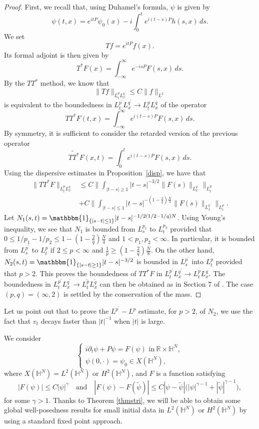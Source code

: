 \documentclass[10pt,leqno]{amsart}
\newcommand{\huom}[2][1=]{\todo[linecolor=red,backgroundcolor=red!10,bordercolor=red,#1]{#2}}
\numberwithin{equation}{section}
\newcommand{\field}[1]{\mathbb{#1}}
\newcommand{\R}{\field{R}}          		%
\newcommand{\Hy}{\field{H}}
\newcommand{\one}{\mathbbm{1}}
\begin{document}
\begin{proof}
First, we recall that, using Duhamel's formula, $\psi$ is given by 
$$\psi(t,x)= e^{itP}\psi_0(x) -i\int_0^t e^{i(t-s)P} h(s,x)\,ds.$$
We set
$$Tf= e^{it P}f(x).$$
Its formal adjoint is then given by
$$T^\ast F(x)= \int_{-\infty}^\infty e^{-isP}F(s,x)\, ds.$$
By the $TT^\ast$ method, we know that 
$$\|Tf \|_{L_t^p L_x^q}\leq C \|f\|_{L^2}$$
is equivalent to the boundedness in $L_t^{p^\prime}L_x^{q^\prime}\rightarrow L_{t}^p L_x^q$ of the operator
$$TT^\ast F (t,x)=\int_{-\infty}^\infty e^{i(t-s)P}F(s,x)\, ds.$$
By symmetry, it is sufficient to consider the retarded version of the previous operator
$$ \widetilde{T T^\ast} F(x,t)= \int_0^t e^{i(t-s)P}F(s,x)\, ds. $$
Using the dispersive estimates in Proposition~\ref{disp}, we have that
\begin{align*}
\|TT^\ast F\|_{L_t^p L_x^q}&\leq C \Big\|\int_{|t-s|\geq 1} |t-s|^{-3/2} \|F(s)\|_{L_x^{q^\prime}} \Big\|_{L_t^p}\\
&+C\Big\|\int_{|t-s|\leq 1} |t-s|^{-(1 -\frac{ 2}{q})\frac{N}{4}} \|F(s)\|_{L_x^{q^\prime}} \Big\|_{L_t^p}.
\end{align*}
Let $N_1(s,t)=\one_{ \{|s-t|\leq 1\}}|t-s|^{-1/2 (1/2 - 1/q)N} $. Using Young's inequality, we see that $N_1$ is bounded from $L_s^{p_1}$ to $L_t^{p_2}$ provided that $0\leq 1/p_1 - 1/p_2 \leq 1- (1-\frac{2}{q} )\frac{N}{4}$ and $1<p_1,p_2 <\infty$. In particular, it is bounded from $L_s^{p^\prime}$ to $L_t^{p}$ if $2\leq p<\infty$ and $\frac{1}{p}\geq (1-\frac{2}{q} )\frac{N}{8}$. On the other hand, $N_2 (s,t)=\one_{ \{|s-t|\geq 1\}}|t-s|^{-3/2 } $ is bounded in $L_s^{p^\prime}$ into $L_t^{p}$ provided that $p> 2$. This proves the boundedness of $TT^\ast F$ in $L_t^{p^\prime}L_x^{q^\prime}\rightarrow L_{t}^p L_x^q$. The boundedness in $L_t^{p^\prime}L_x^{q^\prime}\rightarrow L_{t}^{\tilde{p}} L_x^{\tilde{q}}$ can then be obtained as in Section $7$ of \cite{keel-tao}. %
 The case $(p,q)=(\infty ,2)$ is settled by the conservation of the mass.




\end{proof}

Let us point out that to prove the $L^{p^\prime}-L^p$ estimate, for $p>2$, of $N_2$, we use the fact that $v_t$ decays faster than $|t|^{-1}$ when $|t|$ is large.




We consider 
\begin{equation}
\label{4NLSeq}
\begin{cases}i\partial_t \psi +P \psi =F(\psi)\mbox{ in}\ \R \times \Hy^N ,\\ \psi(0,\cdot)=\psi_0\in X(\Hy^N),\end{cases}
\end{equation}
where $X (\Hy^N)= L^2 (\Hy^N)$ or $H^2 (\Hy^N)$, and $F$ is a function satisfying 
\[
|F(\psi)|\leq C |\psi|^\gamma\quad\text{and}\quad 
|F(\psi)-F(\tilde\psi)|\leq C |\psi-\tilde \psi | \big(|\psi|^{\gamma -1}+|\tilde \psi|^{\gamma -1}\big),
\]
 for some $\gamma>1$. Thanks to Theorem \ref{thmstri}, we will be able to obtain some global well-posedness results for small initial data in $L^2 (\Hy^N)$ or $H^2 (\Hy^N)$ by using a standard fixed point approach. 
\end{document}
